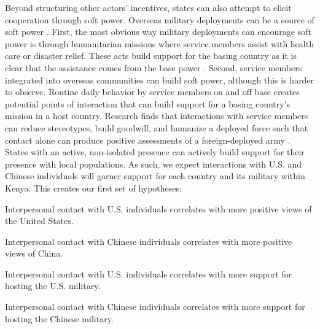 Beyond structuring other actors' incentives, states can also attempt to elicit cooperation through soft power. Overseas military deployments can be a source of soft power \cite{atkinson2014}. First, the most obvious way military deployments can encourage soft power is through humanitarian missions where service members assist with health care or disaster relief. These acts build support for the basing country as it is clear that the assistance comes from the base power \cite{flynn2019}. Second, service members integrated into overseas communities can build soft power, although this is harder to observe. Routine daily behavior by service members on and off base creates potential points of interaction that can build support for a basing country's mission in a host country. Research finds that interactions with service members can reduce stereotypes, build goodwill, and humanize a deployed force such that contact alone can produce positive assessments of a foreign-deployed army \cite{allen2023}. States with an active, non-isolated presence can actively build support for their presence with local populations. As such, we expect interactions with U.S. and Chinese individuals will garner support for each country and its military within Kenya. This creates our first set of hypotheses:

\begin{subhyp}
	
	\begin{hyp}
		Interpersonal contact with U.S. individuals correlates with more positive views of the United States.
	\end{hyp}
	
	\begin{hyp}
		Interpersonal contact with Chinese individuals correlates with more positive views of China.
	\end{hyp}
	
\end{subhyp}

\begin{subhyp}
	
	\begin{hyp}
		Interpersonal contact with U.S. individuals correlates with more support for hosting the U.S. military.
	\end{hyp}
	
	\begin{hyp}
		Interpersonal contact with Chinese individuals correlates with more support for hosting the Chinese military.
	\end{hyp}
	
\end{subhyp}

